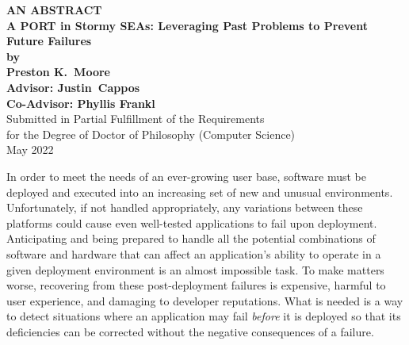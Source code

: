 \begin{center}

{\large\bf
   AN ABSTRACT\\[3ex]
   A PORT in Stormy SEAs: Leveraging Past Problems to Prevent Future Failures\\[2ex]
   by\\[3ex]
   Preston K.\ Moore\\[3ex]
   Advisor: Justin\ Cappos\\[2ex]
   Co-Advisor: Phyllis Frankl
}\\[3ex]
Submitted in Partial Fulfillment of the Requirements\\[2ex]
for the Degree of Doctor of Philosophy (Computer Science)\\[3ex]
May 2022
\end{center}

\vspace*{2.5ex}


In order to meet the needs of an ever-growing user base,
software must be deployed and executed into an
increasing set of new and unusual environments.
Unfortunately, if not handled appropriately, any
variations between these platforms
could cause even well-tested applications to fail upon deployment.
Anticipating and being prepared to handle all the potential combinations of
software and hardware that can affect an application’s ability to operate
in a given deployment environment is an almost impossible task.
To make matters worse,
recovering from these post-deployment failures is expensive,
harmful to user experience,
and damaging to developer reputations.
What is needed is a way to detect situations where an application may fail
\textit{before} it is deployed so that its deficiencies can be corrected without the negative consequences of a failure.

